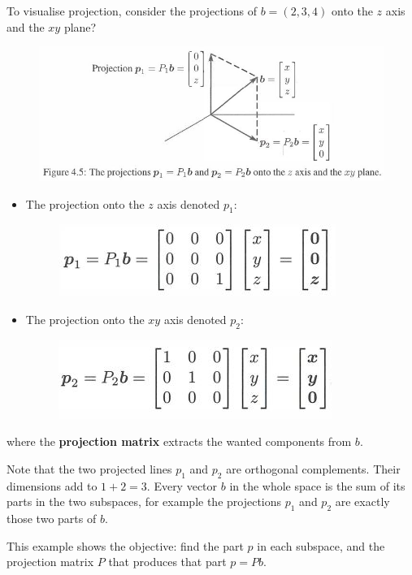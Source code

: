 \documentclass[10pt,a4paper]{article}
\begin{document}
To visualise projection, consider the projections of $b = (2, 3, 4)$ onto the $z$ axis and the $xy$
plane? 
\begin{figure} [h!]
    \centering
    \includegraphics[scale=0.7]{Pro.JPG}
\end{figure}
\begin{itemize}
    \item The projection onto the $z$ axis denoted $p_1$:
    \begin{figure} [h!]
        \centering
        \includegraphics[scale=0.6]{p1.JPG}
    \end{figure}
    \item The projection onto the $xy$ axis denoted $p_2$:
    \begin{figure} [h!]
        \centering
        \includegraphics[scale=0.6]{p2.JPG}
    \end{figure}
\end{itemize}
where the \textbf{projection matrix} extracts the wanted components from $b$.

Note that the two projected lines $p_1$ and $p_2$ are orthogonal complements. Their dimensions add
to $1  +  2  =  3$. Every vector $b$ in the whole space is the sum of its parts in the two
subspaces, for example the projections $p_1$ and $p_2$ are exactly those two parts of $b$.

\pagebreak

This example shows the objective: find the part $p$ in each subspace, and the projection matrix $P$
that produces that part $p = Pb$.  
\end{document}
